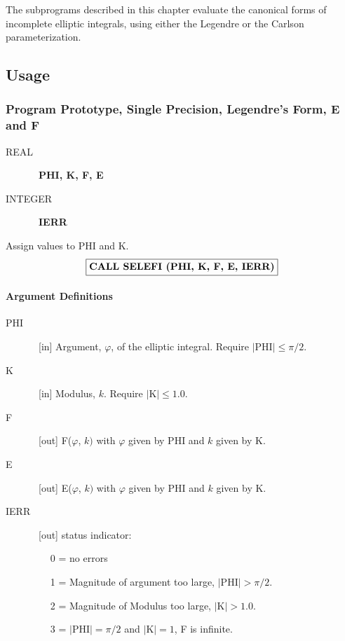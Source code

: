 \documentclass[twoside]{MATH77}
\begin{document}
The subprograms described in this chapter evaluate the canonical forms of
incomplete elliptic integrals, using either the Legendre or the Carlson
parameterization.

\subsection{Usage}

\subsubsection{Program Prototype, Single Precision, Legendre's Form, E and F}

\begin{description}
\item[REAL]  \ {\bf PHI, K, F, E}

\item[INTEGER]  \ {\bf IERR}
\end{description}

Assign values to PHI and K.
$$
\fbox{{\bf CALL SELEFI (PHI, K, F, E, IERR)}}
$$

\paragraph{Argument Definitions}

\begin{description}
\item[PHI]  \ [in] Argument, $\varphi $, of the elliptic integral. Require $|%
\text{PHI}|\leq \pi /2.$

\item[K]  \ [in] Modulus, $k$. Require $|\text{K}|\leq 1.0.$

\item[F]  \ [out] F($\varphi $, $k)$ with $\varphi $ given by PHI and $k$
given by K.

\item[E]  \ [out] E($\varphi $, $k)$ with $\varphi $ given by PHI and $k$
given by K.

\item[IERR]  \ [out] status indicator:

\begin{itemize}
\item[0 =]  no errors

\item[1 =]  Magnitude of argument too large, $|$PHI$| >\pi /2.$

\item[2 =]  Magnitude of Modulus too large, $|$K$|>1.0.$

\item[3 =]  $|$PHI$| =\pi /2$ and $|$K$|=1$, F is infinite.
\end{itemize}
\end{description}
\end{document}
